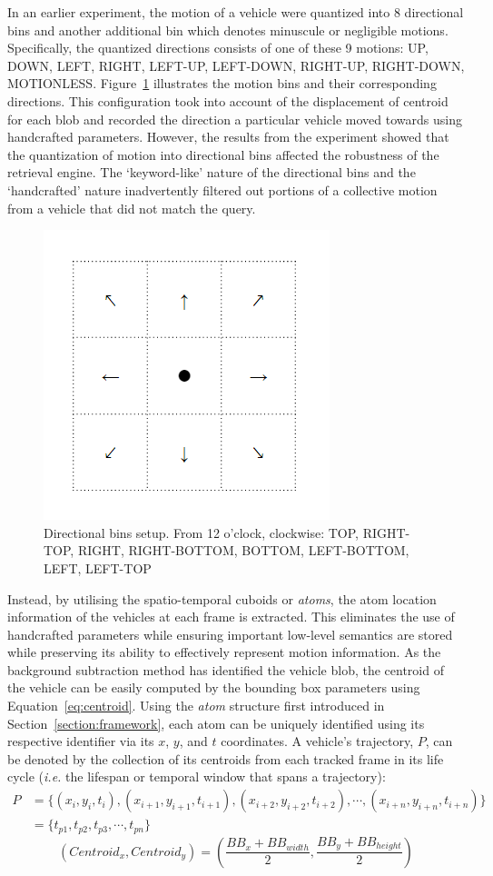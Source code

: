 In an earlier experiment, the motion of a vehicle were quantized into 8 directional bins and another additional bin which denotes minuscule or negligible motions.
Specifically, the quantized directions consists of one of these 9 motions: UP, DOWN, LEFT, RIGHT, LEFT-UP, LEFT-DOWN, RIGHT-UP, RIGHT-DOWN, MOTIONLESS.
Figure~\ref{fig:cardinalbins} illustrates the motion bins and their corresponding directions. 
This configuration took into account of the displacement of centroid for each blob and recorded the direction a particular vehicle moved towards using handcrafted parameters.
However, the results from the experiment showed that the quantization of motion into directional bins affected the robustness of the retrieval engine.
The `keyword-like' nature of the directional bins and the `handcrafted' nature inadvertently filtered out portions of a collective motion from a vehicle that did not match the query. 

\begin{figure}[!thb]\centering
\includegraphics[width=.3\textwidth]{image/new/motion.PNG}
\caption{Directional bins setup. From 12 o'clock, clockwise: TOP, RIGHT-TOP, RIGHT, RIGHT-BOTTOM, BOTTOM, LEFT-BOTTOM, LEFT, LEFT-TOP}
\label{fig:cardinalbins}
\end{figure}

Instead, by utilising the spatio-temporal cuboids or \emph{atoms}, the atom location information of the vehicles at each frame is extracted. This eliminates the use of handcrafted parameters while ensuring important low-level semantics are stored while preserving its ability to effectively represent motion information.
As the background subtraction method has identified the vehicle blob, the centroid of the vehicle can be easily computed by the bounding box parameters using Equation~\ref{eq:centroid}. Using the \emph{atom} structure first introduced in Section~\ref{section:framework}, each atom can be uniquely identified using its respective identifier via its $x$, $y$, and $t$ coordinates. A vehicle's trajectory, $P$, can be denoted by the collection of its centroids from each tracked frame in its life cycle (\emph{i.e.} the lifespan or temporal window that spans a trajectory):
\begin{align}
    P &= \{ (x_i, y_i, t_i), (x_{i+1}, y_{i+1}, t_{i+1}), (x_{i+2}, y_{i+2}, t_{i+2}), \dotsb,(x_{i+n}, y_{i+n}, t_{i+n})\}  \nonumber \\
      &= \{ t_{p1}, t_{p2}, t_{p3}, \dotsb, t_{pn}\}
\end{align}
\begin{equation}
\label{eq:centroid}
(Centroid_x, Centroid_y) = (\frac{BB_{x}+BB_{width}}{2} , \frac{BB_{y}+BB_{height}}{2})
\end{equation}

